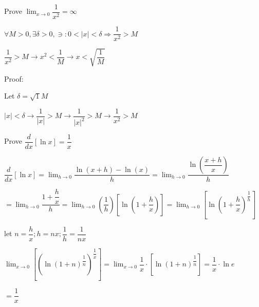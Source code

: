 \documentclass{article}
\begin{document}
\begin{minipage}{0.5\linewidth}
Prove $\displaystyle \lim_{x\to 0} \dfrac{1}{x^2} = \infty$

$\forall M > 0, \exists \delta > 0, \ni : 0 < |x | < \delta \Longrightarrow \dfrac{1}{x^2} > M$

$\dfrac{1}{x^2} > M \rightarrow x^2 < \dfrac{1}{M} \rightarrow x < \sqrt{\dfrac{1}{M}}$

Proof:

Let $\delta = \sqrt{1}{M}$

$|x| < \delta \rightarrow \dfrac{1}{|x|} > {M} \rightarrow \dfrac{1}{|x|^2} > M \rightarrow \dfrac{1}{x^2} > M$
\end{minipage}
\begin{minipage}{0.5\linewidth}
Prove $\dfrac{d}{dx}[\ln x] = \dfrac{1}{x}$

$\dfrac{d}{dx}[\ln x] = \displaystyle \lim_{h \to 0} \dfrac{\ln(x + h) - \ln(x)}{h} = \lim_{h \to 0} \dfrac{\ln(\dfrac{x + h}{x})}{h}$

\vspace{0.2cm}

$\displaystyle = \lim_{h \to 0} \dfrac{1 + \dfrac{h}{x}}{h} = \lim_{h \to 0} (\dfrac{1}{h})[\ln(1 + \dfrac{h}{x})] = \lim_{h \to 0} [\ln(1 + \dfrac{h}{x})^{\dfrac{1}{h}}]$

\vspace{0.2cm}

let $n = \dfrac{h}{x}; h = nx; \dfrac{1}{h} = \dfrac{1}{nx}$

\vspace{0.2cm}

$\displaystyle \lim_{x\to 0} [(\ln(1 + n)^{\dfrac{1}{n}})^{\dfrac{1}{x}}] = \lim_{x \to 0} \dfrac{1}{x} \cdot [\ln(1 + n)^{\dfrac{1}{n}}] = \dfrac{1}{x} \cdot \ln e$

$ = \dfrac{1}{x}$

\end{minipage}

\pagebreak

\text{}
\end{document}
